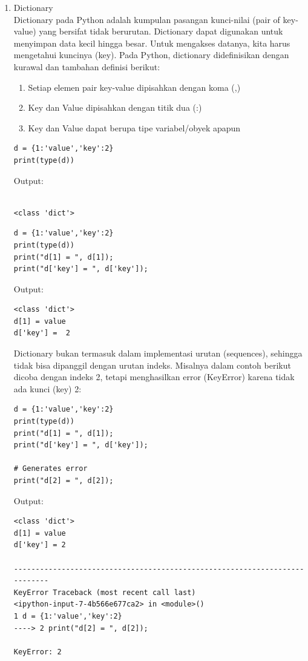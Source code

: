\begin{enumerate}
\item Dictionary\\
Dictionary pada Python adalah kumpulan pasangan kunci-nilai (pair of key-value) yang bersifat tidak berurutan. Dictionary dapat digunakan untuk menyimpan data kecil hingga besar. Untuk mengakses datanya, kita harus mengetahui kuncinya (key). Pada Python, dictionary didefinisikan dengan kurawal dan tambahan definisi berikut:
\begin{enumerate}
\item Setiap elemen pair key-value dipisahkan dengan koma (,)
\item Key dan Value dipisahkan dengan titik dua (:)
\item Key dan Value dapat berupa tipe variabel/obyek apapun
\end{enumerate}

\begin{verbatim}
d = {1:'value','key':2}
print(type(d))
\end{verbatim}
Output:
\begin{verbatim}

<class 'dict'>

\end{verbatim}

\begin{verbatim}
d = {1:'value','key':2}
print(type(d))
print("d[1] = ", d[1]);
print("d['key'] = ", d['key']);
\end{verbatim}

Output:
\begin{verbatim}
<class 'dict'>
d[1] = value
d['key'] =  2
\end{verbatim}
Dictionary bukan termasuk dalam implementasi urutan (sequences), sehingga tidak bisa dipanggil dengan urutan indeks. Misalnya dalam contoh berikut dicoba dengan indeks 2, tetapi menghasilkan error (KeyError) karena tidak ada kunci (key) 2:

\begin{verbatim}
d = {1:'value','key':2}
print(type(d))
print("d[1] = ", d[1]);
print("d['key'] = ", d['key']);
 
# Generates error
print("d[2] = ", d[2]);
\end{verbatim}

Output:
\begin{verbatim}
<class 'dict'>
d[1] = value
d['key'] = 2

---------------------------------------------------------------------------
KeyError Traceback (most recent call last)
<ipython-input-7-4b566e677ca2> in <module>()
1 d = {1:'value','key':2}
----> 2 print("d[2] = ", d[2]);

KeyError: 2
\end{verbatim}

\end{enumerate}

